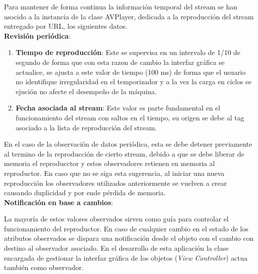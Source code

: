 Para mantener de forma continua la información temporal del stream se han asocido a la instancia de la clase AVPlayer, dedicada a la reproducción del stream entregado por URL, los siguientes datos.\\

\textbf{Revisión periódica}:

\begin{enumerate}
\item \textbf{Tiempo de reproducción}: Este se supervisa en un intervalo de 1/10 de segundo de forma que con esta razon de cambio la interfaz gráfica se actualice, se ajusta a  este valor de tiempo (100 ms) de forma que el usuario no identifique irregularidad en el temporizador y a la vez la carga en ciclos se ejución no afecte el desempeño de la máquina.
\item \textbf{Fecha asociada al stream}: Este valor es parte fundamental en el funcionamiento del stream con saltos en el tiempo, su origen se debe al tag asociado a la lista de reproducción del stream.
\label{observer-date}
\end{enumerate}

En el caso de la observación de datos periódica, esta se debe detener previamente al termino de la reproducción de cierto stream, debido a que se debe liberar de memoria el reproducctor y estos observadores retienen en memoria al reproductor. En caso que no se siga esta sugerencia, al iniciar una nueva reproducción los observadores utilizados anteriormente se vuelven a crear causando duplicidad y por ende pérdida de memoria.\\


\textbf{Notificación en base a cambios}:

La mayoría de estos valores observados sirven como guía para controlar el funcionamiento del reproductor. En caso de cualquier cambio en el estado de los atributos observados se dispara una notificación desde el objeto con el cambio con destino al observador asociado. 
En el desarrollo de esta aplicación la clase encargada de gestionar la interfaz gráfica de los objetos (\textit{View Controller}) actua también como observador.\\

